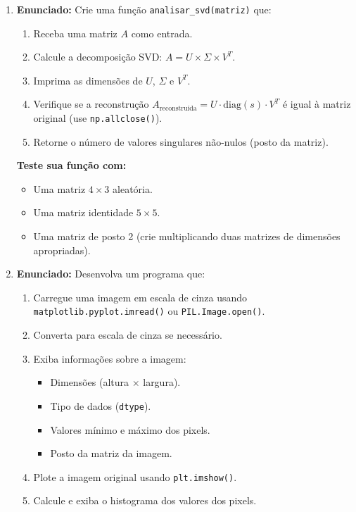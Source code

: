 \documentclass[a4paper,12pt]{article}
\begin{document}
\begin{enumerate}
    \item \textbf{Enunciado:}
    Crie uma função \texttt{analisar\_svd(matriz)} que:
    \begin{enumerate}
        \item Receba uma matriz $A$ como entrada.
        \item Calcule a decomposição SVD: $A = U \times \Sigma \times V^T$.
        \item Imprima as dimensões de $U$, $\Sigma$ e $V^T$.
        \item Verifique se a reconstrução $A_{\text{reconstruída}} = U \cdot \text{diag}(s) \cdot V^T$ é igual à matriz original (use \texttt{np.allclose()}).
        \item Retorne o número de valores singulares não-nulos (posto da matriz).
    \end{enumerate}
    \textbf{Teste sua função com:}
    \begin{itemize}
        \item Uma matriz $4 \times 3$ aleatória.
        \item Uma matriz identidade $5 \times 5$.
        \item Uma matriz de posto 2 (crie multiplicando duas matrizes de dimensões apropriadas).
    \end{itemize}

    \item \textbf{Enunciado:}
    Desenvolva um programa que:
    \begin{enumerate}
        \item Carregue uma imagem em escala de cinza usando \texttt{matplotlib.pyplot.imread()} ou \texttt{PIL.Image.open()}.
        \item Converta para escala de cinza se necessário.
        \item Exiba informações sobre a imagem:
        \begin{itemize}
            \item Dimensões (altura $\times$ largura).
            \item Tipo de dados (\texttt{dtype}).
            \item Valores mínimo e máximo dos pixels.
            \item Posto da matriz da imagem.
        \end{itemize}
        \item Plote a imagem original usando \texttt{plt.imshow()}.
        \item Calcule e exiba o histograma dos valores dos pixels.
    \end{enumerate}


\end{enumerate}
\end{document}
